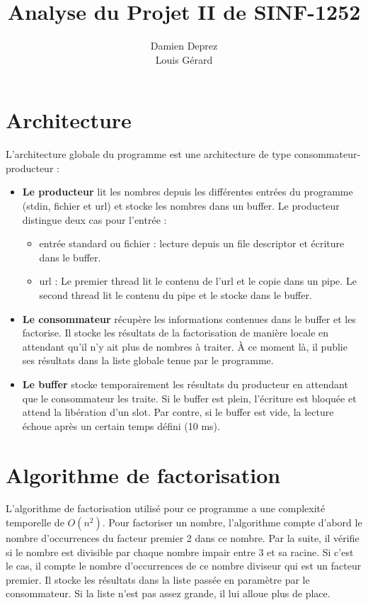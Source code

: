 \documentclass[12pt]{article}
\begin{document}
\title{Analyse du Projet II de SINF-1252}
\author{Damien Deprez \\ Louis Gérard}
\maketitle
\section{Architecture}
L'architecture globale du programme est une architecture de type consommateur-producteur : 
\begin{itemize}
\item \textbf{Le producteur} lit les nombres depuis les différentes entrées du programme (stdin, fichier et url) et stocke les nombres dans un buffer. Le producteur distingue deux cas pour l'entrée : 
\begin{itemize}
\item entrée standard ou fichier : lecture depuis un file descriptor et écriture dans le buffer.
\item url : Le premier thread lit le contenu de l'url et le copie dans un pipe. Le second thread lit le contenu du pipe et le stocke dans le buffer.
\end{itemize}
\item \textbf{Le consommateur} récupère les informations contenues dans le buffer et les factorise. Il stocke les résultats de la factorisation de manière locale en attendant qu'il n'y ait plus de nombres à traiter. À ce moment là, il publie ses résultats dans la liste globale tenue par le programme.

\item \textbf{Le buffer} stocke temporairement les résultats du producteur en attendant que le consommateur les traite. Si le buffer est plein, l'écriture est bloquée et attend la libération d'un slot. Par contre, si le buffer est vide, la lecture échoue après un certain temps défini (10 ms).
\end{itemize}

\section{Algorithme de factorisation}
L'algorithme de factorisation utilisé pour ce programme a une complexité temporelle de $O(n^2)$. Pour factoriser un nombre, l'algorithme compte d'abord le nombre d'occurrences du facteur premier 2 dans ce nombre. Par la suite, il vérifie si le nombre est divisible par chaque nombre impair entre 3 et sa racine. Si c'est le cas, il compte le nombre d'occurrences de ce nombre diviseur qui est un facteur premier. Il stocke les résultats dans la liste passée en paramètre par le consommateur. Si la liste n'est pas assez grande, il lui alloue plus de place.
\end{document}
